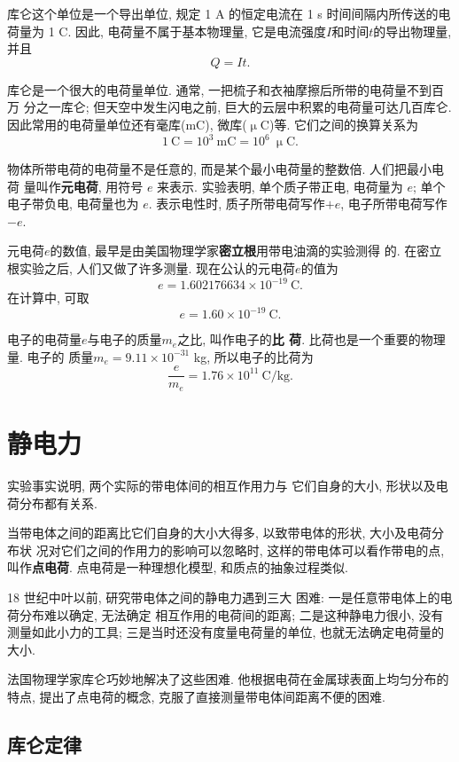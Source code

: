 \documentclass[11pt,a4paper]{ctexbook}
\begin{document}
库仑这个单位是一个导出单位, 规定 1 A 的恒定电流在 1 s 时间间隔内所传送的电荷量为 1 C. 因此,
电荷量不属于基本物理量, 它是电流强度$I$和时间$t$的导出物理量, 并且$$Q = It.$$

库仑是一个很大的电荷量单位. 通常, 一把梳子和衣袖摩擦后所带的电荷量不到百万
分之一库仑; 但天空中发生闪电之前, 巨大的云层中积累的电荷量可达几百库仑.
因此常用的电荷量单位还有毫库(mC), 微库($\upmu$C)等. 它们之间的换算关系为
$$1\ \mathrm{C} = 10^3\ \mathrm{mC} = 10^6\ \upmu\mathrm{C}.$$

物体所带电荷的电荷量不是任意的, 而是某个最小电荷量的整数倍. 人们把最小电荷
量叫作\textbf{元电荷}, 用符号 $e$ 来表示. 实验表明, 单个质子带正电, 电荷量为 $e$; 单个电子带负电, 电荷量也为 $e$. 表示电性时, 质子所带电荷写作$+e$, 电子所带电荷写作$-e$.

元电荷$e$的数值, 最早是由美国物理学家\textbf{密立根}用带电油滴的实验测得
的. 在密立根实验之后, 人们又做了许多测量. 现在公认的元电荷$e$的值为
$$e = 1.602 176 634 \times 10^{-19}\ \mathrm{C}.$$
在计算中, 可取
$$e = 1.60 \times 10^{-19}\ \mathrm{C}.$$

电子的电荷量$e$与电子的质量$m_e$之比, 叫作电子的\textbf{比
    荷}. 比荷也是一个重要的物理量. 电子的
质量$m_e = 9.11\times 10^{-31}$ kg, 所以电子的比荷为
$$\frac{e}{m_e} = 1.76 \times 10^{11}\ \mathrm{C/kg}.$$

\section{静电力}

实验事实说明, 两个实际的带电体间的相互作用力与
它们自身的大小, 形状以及电荷分布都有关系.

当带电体之间的距离比它们自身的大小大得多, 以致带电体的形状, 大小及电荷分布状
况对它们之间的作用力的影响可以忽略时, 这样的带电体可以看作带电的点, 叫作\textbf{点电荷}.
点电荷是一种理想化模型, 和质点的抽象过程类似.

18 世纪中叶以前, 研究带电体之间的静电力遇到三大
困难: 一是任意带电体上的电荷分布难以确定, 无法确定
相互作用的电荷间的距离; 二是这种静电力很小, 没有
测量如此小力的工具; 三是当时还没有度量电荷量的单位,
也就无法确定电荷量的大小.

法国物理学家库仑巧妙地解决了这些困难.
他根据电荷在金属球表面上均匀分布的特点, 提出了点电荷的概念,
克服了直接测量带电体间距离不便的困难.

\subsection{库仑定律}
\end{document}
